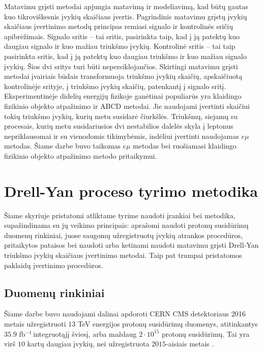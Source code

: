 \documentclass[a4paper, 12pt, oneside]{article}
\newcommand{\emu}{e\mu}
\newcommand{\invfb}{fb$^{-1}\,$}
\begin{document}
Matavimu grįsti metodai apjungia matavimą ir modeliavimą, kad būtų gautas kuo tikroviškesnis įvykių skaičiaus įvertis.
Pagrindinis matavimu grįstų įvykių skaičiaus įvertinimo metodų principas remiasi signalo ir kontrolinės sričių apibrėžimais.
Signalo sritis -- tai sritis, pasirinkta taip, kad į ją patektų kuo daugiau signalo ir kuo mažiau triukšmo įvykių.
Kontrolinė sritis -- tai taip pasirinkta sritis, kad į ją patektų kuo daugiau triukšmo ir kuo mažiau signalo įvykių.
Šios dvi sritys turi būti nepersiklojančios.
Skirtingi matavimu grįsti metodai įvairiais būdais transformuoja triukšmo įvykių skaičių, apskaičiuotą kontrolinėje
srityje, į triukšmo įvykių skaičių, patenkantį į signalo sritį.
Eksperimentinėje didelių energijų fizikoje ganėtinai populiarūs yra klaidingo fizikinio objekto atpažinimo ir ABCD metodai.
Jie naudojami įvertinti skaičiui tokių triukšmo įvykių, kurių metu susidarė čiurkšlės.
Triukšmų, siejamų su procesais, kurių metu susidariusios dvi nestabilios dalelės skyla į leptonus nepriklausomai ir su
vienodomis tikimybėmis, indėliui įvertinti naudojamas $\emu$ metodas.
Šiame darbe buvo taikomas $\emu$ metodas bei ruošiamasi klaidingo fizikinio objekto atpažinimo metodo pritaikymui.

\section{Drell-Yan proceso tyrimo metodika}

Šiame skyriuje pristatomi atliktame tyrime naudoti įrankiai bei metodika, supažindinama su jų veikimo principais:
aprašomi naudoti protonų susidūrimų duomenų rinkiniai, juose saugomų užregistruotų įvykių atrankos procedūros,
pritaikytos pataisos bei naudoti arba ketinami naudoti matavimu grįsti Drell-Yan triukšmo įvykių skaičiaus įvertinimo
metodai.
Taip pat trumpai pristatomos paklaidų įvertinimo procedūros.

\subsection{Duomenų rinkiniai}

Šiame darbe buvo naudojami dalinai apdoroti CERN CMS detektoriaus 2016 metais užregistruoti $13$ TeV
energijos protonų susidūrimų duomenys, atitinkantys $35.9$ \invfb integruotąjį šviesį, arba maždaug
$2 \cdot 10^{15}$ protonų susidūrimų.
Tai yra virš $10$ kartų daugiau įvykių, nei užregistruota $2015$-aisiais metais \cite{DY2018}.
\end{document}
